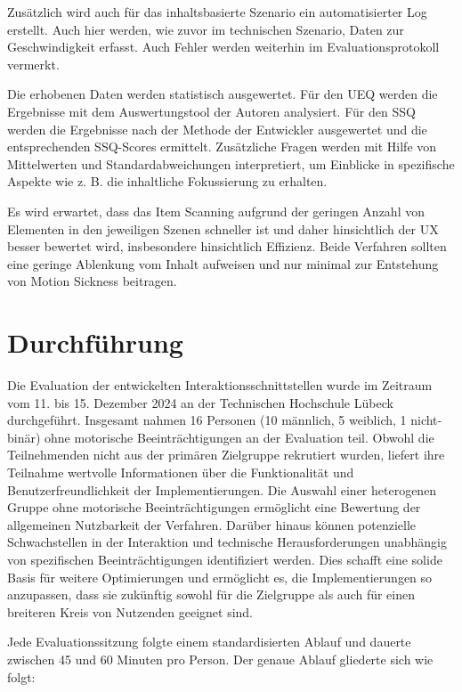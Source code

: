 Zusätzlich wird auch für das inhaltsbasierte Szenario ein automatisierter Log erstellt. Auch hier werden, wie zuvor im technischen Szenario, Daten zur Geschwindigkeit erfasst. Auch Fehler werden weiterhin im Evaluationsprotokoll vermerkt. 

Die erhobenen Daten werden statistisch ausgewertet. Für den UEQ werden die Ergebnisse mit dem Auswertungstool der Autoren analysiert. Für den SSQ werden die Ergebnisse nach der Methode der Entwickler ausgewertet und die entsprechenden SSQ-Scores ermittelt. Zusätzliche Fragen werden mit Hilfe von Mittelwerten und Standardabweichungen interpretiert, um Einblicke in spezifische Aspekte wie z. B.  die inhaltliche Fokussierung zu erhalten.

Es wird erwartet, dass das Item Scanning aufgrund der geringen Anzahl von Elementen in den jeweiligen Szenen schneller ist und daher hinsichtlich der UX besser bewertet wird, insbesondere hinsichtlich Effizienz. Beide Verfahren sollten eine geringe Ablenkung vom Inhalt aufweisen und nur minimal zur Entstehung von Motion Sickness beitragen.

\section{Durchführung}

Die Evaluation der entwickelten Interaktionsschnittstellen wurde im Zeitraum vom 11. bis 15. Dezember 2024 an der Technischen Hochschule Lübeck durchgeführt. Insgesamt nahmen 16 Personen (10 männlich, 5 weiblich, 1 nicht-binär) ohne motorische Beeinträchtigungen an der Evaluation teil. Obwohl die Teilnehmenden nicht aus der primären Zielgruppe rekrutiert wurden, liefert ihre Teilnahme wertvolle Informationen über die Funktionalität und Benutzerfreundlichkeit der Implementierungen. Die Auswahl einer heterogenen Gruppe ohne motorische Beeinträchtigungen ermöglicht eine Bewertung der allgemeinen Nutzbarkeit der Verfahren. Darüber hinaus können potenzielle Schwachstellen in der Interaktion und technische Herausforderungen unabhängig von spezifischen Beeinträchtigungen identifiziert werden. Dies schafft eine solide Basis für weitere Optimierungen und ermöglicht es, die Implementierungen so anzupassen, dass sie zukünftig sowohl für die Zielgruppe als auch für einen breiteren Kreis von Nutzenden geeignet sind.

Jede Evaluationssitzung folgte einem standardisierten Ablauf und dauerte zwischen 45 und 60 Minuten pro Person. Der genaue Ablauf gliederte sich wie folgt:

